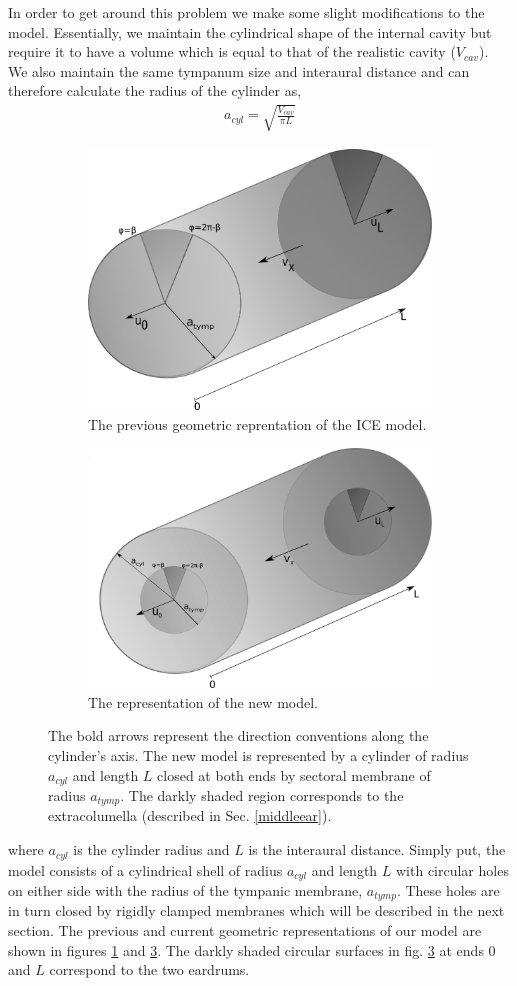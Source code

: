 In order to get around this problem we make some slight modifications to the model. Essentially, we maintain the cylindrical shape of the internal 
cavity but require it to have a volume which is equal to that of the realistic cavity ($V_{cav}$). We also maintain the same tympanum size and interaural distance
and can therefore calculate the radius of the cylinder as,
\begin{align}
 a_{cyl}=\sqrt{\frac{V_{cav}}{\pi L}}
\end{align}
\begin{figure}[ht!]
\begin{center}
\begin{subfigure}{1.0\textwidth}
 \centering
  \includegraphics[width=.5\linewidth]{Diagrams/oldCylinder.png}
   \caption[Previous ICE Model Cylinder]{The previous geometric reprentation of the ICE model.}
  \label{oldICE}
\end{subfigure}

\begin{subfigure}{1.0\textwidth}
\centering
  \includegraphics[width=.5\linewidth]{Diagrams/newCylinder.png}
  \caption[New ICE Model Cylinder]{The representation of the new model.}
  \label{newICE}
  \end{subfigure}
  \caption[Previous and current ICE model representations]{The bold arrows represent the direction conventions
  along the cylinder's axis. The new model is represented by a cylinder of radius $a_{cyl}$ and length $L$ closed
  at both ends by sectoral membrane of radius $a_{tymp}$.
  The darkly shaded region corresponds to the extracolumella (described in Sec. \ref{middleear}).}
\end{center}
\end{figure}
where $a_{cyl}$ is the cylinder radius and $L$ is the interaural distance. Simply put, the model consists of a cylindrical shell
of radius $a_{cyl}$ and length $L$ with circular holes on either side with the radius of the tympanic membrane, $a_{tymp}$. These
holes are in turn closed by rigidly clamped membranes which will be described in the next section. The previous and current geometric representations
of our model are shown in figures \ref{oldICE} and \ref{newICE}. The darkly shaded circular surfaces in fig. \ref{newICE} at ends $0$ and $L$ correspond to the two
eardrums.

